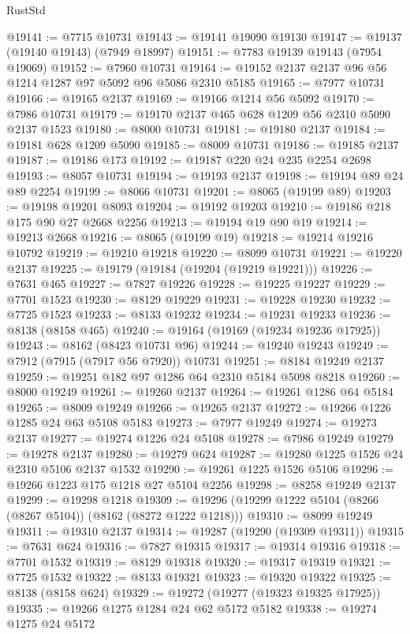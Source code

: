 \begin{lexlean}{RustStd}
\begin{coremodule}
@19141 := @7715 @10731
@19143 := @19141 @19090 @19130
@19147 := @19137 (@19140 @19143) (@7949 @18997)
@19151 := @7783 @19139 @19143 (@7954 @19069)
@19152 := @7960 @10731
@19164 := @19152 @2137 @2137 @96 @56 @1214 @1287 @97 @5092 @96 @5086 @2310 @5185
@19165 := @7977 @10731
@19166 := @19165 @2137
@19169 := @19166 @1214 @56 @5092
@19170 := @7986 @10731
@19179 := @19170 @2137 @465 @628 @1209 @56 @2310 @5090 @2137 @1523
@19180 := @8000 @10731
@19181 := @19180 @2137
@19184 := @19181 @628 @1209 @5090
@19185 := @8009 @10731
@19186 := @19185 @2137
@19187 := @19186 @173
@19192 := @19187 @220 @24 @235 @2254 @2698
@19193 := @8057 @10731
@19194 := @19193 @2137
@19198 := @19194 @89 @24 @89 @2254
@19199 := @8066 @10731
@19201 := @8065 (@19199 @89)
@19203 := @19198 @19201 @8093
@19204 := @19192 @19203
@19210 := @19186 @218 @175 @90 @27 @2668 @2256
@19213 := @19194 @19 @90 @19
@19214 := @19213 @2668
@19216 := @8065 (@19199 @19)
@19218 := @19214 @19216 @10792
@19219 := @19210 @19218
@19220 := @8099 @10731
@19221 := @19220 @2137
@19225 := @19179 (@19184 (@19204 (@19219 @19221)))
@19226 := @7631 @465
@19227 := @7827 @19226
@19228 := @19225 @19227
@19229 := @7701 @1523
@19230 := @8129 @19229
@19231 := @19228 @19230
@19232 := @7725 @1523
@19233 := @8133 @19232
@19234 := @19231 @19233
@19236 := @8138 (@8158 @465)
@19240 := @19164 (@19169 (@19234 @19236 @17925))
@19243 := @8162 (@8423 @10731 @96)
@19244 := @19240 @19243
@19249 := @7912 (@7915 (@7917 @56 @7920)) @10731
@19251 := @8184 @19249 @2137
@19259 := @19251 @182 @97 @1286 @64 @2310 @5184 @5098 @8218
@19260 := @8000 @19249
@19261 := @19260 @2137
@19264 := @19261 @1286 @64 @5184
@19265 := @8009 @19249
@19266 := @19265 @2137
@19272 := @19266 @1226 @1285 @24 @63 @5108 @5183
@19273 := @7977 @19249
@19274 := @19273 @2137
@19277 := @19274 @1226 @24 @5108
@19278 := @7986 @19249
@19279 := @19278 @2137
@19280 := @19279 @624
@19287 := @19280 @1225 @1526 @24 @2310 @5106 @2137 @1532
@19290 := @19261 @1225 @1526 @5106
@19296 := @19266 @1223 @175 @1218 @27 @5104 @2256
@19298 := @8258 @19249 @2137
@19299 := @19298 @1218
@19309 := @19296 (@19299 @1222 @5104 (@8266 (@8267 @5104)) (@8162 (@8272 @1222 @1218)))
@19310 := @8099 @19249
@19311 := @19310 @2137
@19314 := @19287 (@19290 (@19309 @19311))
@19315 := @7631 @624
@19316 := @7827 @19315
@19317 := @19314 @19316
@19318 := @7701 @1532
@19319 := @8129 @19318
@19320 := @19317 @19319
@19321 := @7725 @1532
@19322 := @8133 @19321
@19323 := @19320 @19322
@19325 := @8138 (@8158 @624)
@19329 := @19272 (@19277 (@19323 @19325 @17925))
@19335 := @19266 @1275 @1284 @24 @62 @5172 @5182
@19338 := @19274 @1275 @24 @5172

\end{coremodule}
\end{lexlean}
